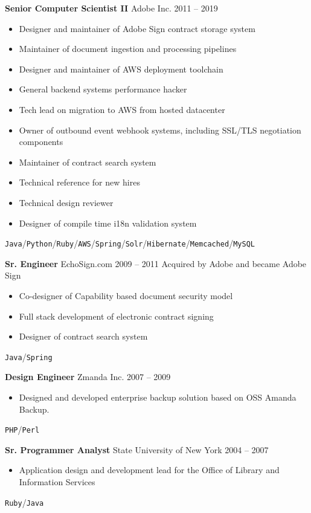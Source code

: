 \documentclass{res}
\begin{document}
        {\bf Senior Computer Scientist II} \hfill Adobe Inc. \hfill 2011 -- 2019
        \begin{itemize}
        \item Designer and maintainer of Adobe Sign contract storage system
        \item Maintainer of document ingestion and processing pipelines
        \item Designer and maintainer of AWS deployment toolchain
        \item General backend systems performance hacker
        \item Tech lead on migration to AWS from hosted datacenter
        \item Owner of outbound event webhook systems, including SSL/TLS negotiation components
        \item Maintainer of contract search system
        \item Technical reference for new hires
        \item Technical design reviewer
        \item Designer of compile time i18n validation system
        \end{itemize}
	\texttt{Java}\slash\texttt{Python}\slash\texttt{Ruby}\slash\texttt{AWS}\slash\texttt{Spring}\slash\texttt{Solr}\slash\texttt{Hibernate}\slash\texttt{Memcached}\slash\texttt{MySQL}
        

        {\bf Sr. Engineer} \hfill EchoSign.com 2009 -- 2011
        Acquired by Adobe and became Adobe Sign
        \begin{itemize}
        \item Co-designer of Capability based document security model
        \item Full stack development of electronic contract signing
        \item Designer of contract search system
        \end{itemize}
	\texttt{Java}\slash\texttt{Spring}
        
        {\bf Design Engineer} \hfill Zmanda Inc. \hfill 2007 -- 2009
        \begin{itemize}
        \item Designed and developed enterprise backup solution based on OSS Amanda Backup.
        \end{itemize}
        \texttt{PHP}\slash\texttt{Perl}
        
        {\bf Sr. Programmer Analyst} \hfill State University of New York \hfill 2004 -- 2007
        \begin{itemize}
        \item Application design and development lead for the Office of Library and Information Services
        \end{itemize}
        \texttt{Ruby}\slash\texttt{Java}
          
\end{document}
